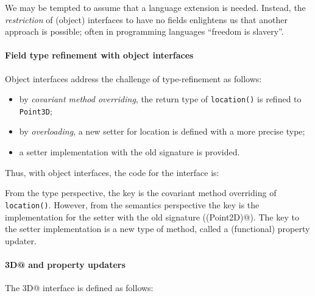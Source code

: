 We may be tempted to assume that a language extension is needed.
Instead, the \emph{restriction} of (object) interfaces to have no
fields enlightens us that another approach is possible; often in programming languages ``freedom is slavery''.

\paragraph{Field type refinement with object interfaces}
Object interfaces address the challenge of type-refinement as follows:
\begin{itemize}
\item by \emph{covariant method overriding}, the return type of
  \texttt{location()} is refined to \texttt{Point3D};
\item by \emph{overloading}, a new setter for location is defined with a more
  precise type;
\item a \Q@default@ setter implementation with the old signature is provided.
\end{itemize}

Thus, with object interfaces, the code for the \Q@Bird@ interface is:



\noindent From the type perspective, the key is the covariant method
overriding of \texttt{location()}. However, from the semantics
perspective the key is the implementation for the setter with the old
signature (\Q@location(Point2D)@). The key to the setter
implementation is a new type of \Q@with@ method, called
 a (functional) property updater.

\paragraph{\Q@Point3D@ and property updaters}
The \Q@Point3D@ interface is defined as follows:


